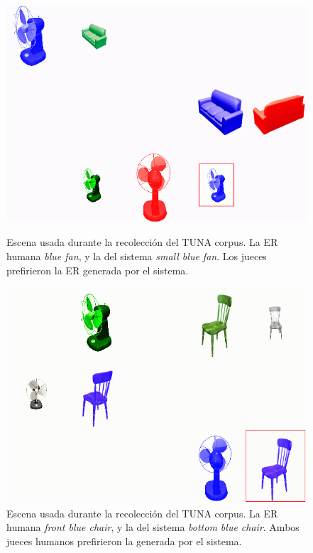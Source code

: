 \begin{figure}[H]
\begin{minipage}{0.48\linewidth}
\centering
\includegraphics[width=\textwidth]{images/smallBlueFan.jpg}
\caption{Escena usada durante la recolecci\'on del TUNA corpus. La ER humana \emph{blue fan}, y la del sistema \emph{small blue fan}. Los jueces prefirieron la ER generada por el sistema.}
\label{smallBlueFan}
\end{minipage}
\hspace*{.04cm}
\begin{minipage}{0.48\linewidth}
\centering
\vspace*{.4cm}
\includegraphics[width=\textwidth]{images/tuna.jpg} 
\vspace*{-.4cm}
\caption{Escena usada durante la recolecci\'on del TUNA corpus. La ER humana \emph{front blue chair}, y la del sistema \emph{bottom blue chair}. Ambos jueces humanos prefirieron la generada por el sistema.}
\label{BlueChair}
\end{minipage}
\end{figure}

